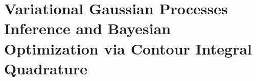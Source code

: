 \chapter{Variational Gaussian Processes Inference and Bayesian Optimization via Contour Integral Quadrature}
\label{chapter:ciq}








